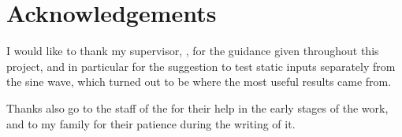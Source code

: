 
\section*{Acknowledgements}
\label{sec:acknowledgements}

I would like to thank my supervisor, \supervisorName, for the guidance given
throughout this project, and in particular for the suggestion to test static
inputs separately from the sine wave, which turned out to be where the most
useful results came from.

Thanks also go to the staff of the \departmentName{} for their help in the
early stages of the work, and to my family for their patience during the
writing of it.
